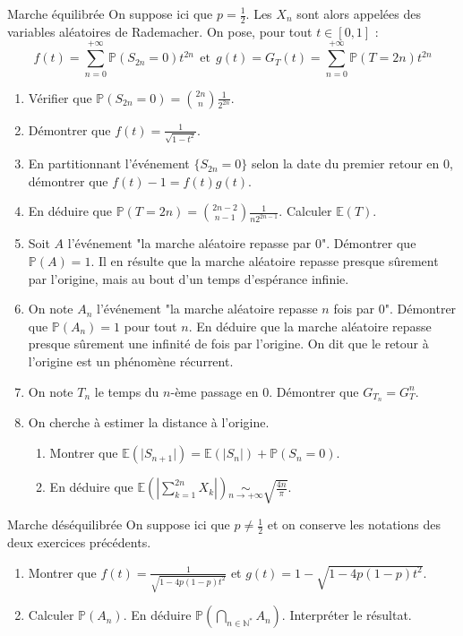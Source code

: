 \documentclass[french,a4paper]{article}
\renewcommand{\P}{\mathbb{P}}
\newcommand{\N}{\mathbb{N}}
\newcommand{\st}{^*}
\newcommand{\E}{\mathbb{E}}
\theoremstyle{plain}
\theoremstyle{definition}
\theoremstyle{remark}
\begin{document}
\begin{ex}[Châteaux]{Marche équilibrée}
	On suppose ici que $p=\displaystyle\frac{1}{2}$. Les $X_n$ sont alors appelées des variables aléatoires de Rademacher. On pose, pour tout $t\in[0,1]$ : $$f(t)=\sum_{n=0}^{+\infty}\P(S_{2n}=0)t^{2n}\ \ \text{et}\ \ g(t)=G_T(t)=\sum_{n=0}^{+\infty}\P(T=2n)t^{2n}$$
	\begin{enumerate}
		\item Vérifier que $\P(S_{2n}=0)=\displaystyle\binom{2n}{n}\frac{1}{2^{2n}}$.
		\item Démontrer que $f(t)=\displaystyle\frac{1}{\sqrt{1-t^2}}$.
		\item En partitionnant l'événement $\{S_{2n}=0\}$ selon la date du premier retour en $0$, démontrer que $f(t)-1=f(t)g(t)$.
		\item En déduire que $\P(T=2n)=\displaystyle\binom{2n-2}{n-1}\frac{1}{n2^{2n-1}}$. Calculer $\E(T)$.
		\item Soit $A$ l'événement "la marche aléatoire repasse par $0$". Démontrer que $\P(A)=1$. Il en résulte que la marche aléatoire repasse presque sûrement par l'origine, mais au bout d'un temps d'espérance infinie.
		\item On note $A_n$ l'événement "la marche aléatoire repasse $n$ fois par $0$". Démontrer que $\P(A_n)=1$ pour tout $n$. En déduire que la marche aléatoire repasse presque sûrement une infinité de fois par l'origine. On dit que le retour à l'origine est un phénomène récurrent.
		\item On note $T_n$ le temps du $n$-ème passage en $0$. Démontrer que $G_{T_n}=G_T^n$.
		\item On cherche à estimer la distance à l'origine.
		\begin{enumerate}[label=\alph*.]
			\item Montrer que $\E(\lvert S_{n+1}\rvert)=\E(\lvert S_n\rvert)+\P(S_n=0)$.
			\item En déduire que $\displaystyle\E\left(\left\lvert\sum_{k=1}^{2n}X_k\right\rvert\right)\underset{n\to+\infty}{\sim}\sqrt{\frac{4n}{\pi}}$.
		\end{enumerate}
	\end{enumerate}
\end{ex}
\begin{ex}[Châteaux]{Marche déséquilibrée}
	On suppose ici que $p\ne\displaystyle\frac{1}{2}$ et on conserve les notations des deux exercices précédents.
	\begin{enumerate}
		\item Montrer que $f(t)=\displaystyle\frac{1}{\sqrt{1-4p(1-p)t^2}}$ et $g(t)=1-\sqrt{1-4p(1-p)t^2}$.
		\item Calculer $\P(A_n)$. En déduire $\P\left(\bigcap_{n\in\N\st}A_n\right)$. Interpréter le résultat.
	\end{enumerate}
\end{ex}
\end{document}
